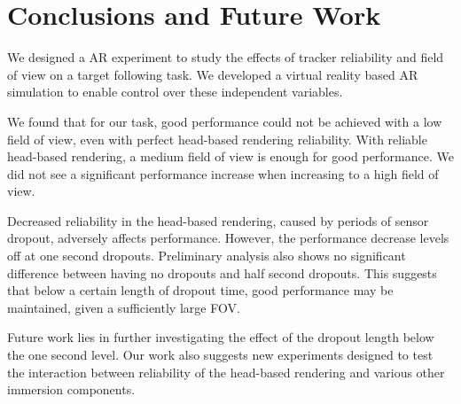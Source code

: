 \documentclass{acmsiggraph}                     %
\begin{document}

\section{Conclusions and Future Work}

We designed a AR experiment to study the effects of tracker reliability and field of view on a target following task.  We developed a virtual reality based AR simulation to enable control over these independent variables.

We found that for our task, good performance could not be achieved with a low field of view, even with perfect head-based rendering reliability.
With reliable head-based rendering, a medium field of view is enough for good performance.  We did not see a significant performance increase when increasing to a high field of view.

Decreased reliability in the head-based rendering, caused by periods of sensor dropout, adversely affects performance.  However, the performance decrease levels off at one second dropouts.  Preliminary analysis also shows no significant difference between having no dropouts and half second dropouts.  This suggests that below a certain length of dropout time, good performance may be maintained, given a sufficiently large FOV.%

Future work lies in further investigating the effect of the dropout length 
below the one second level.  Our work also suggests new experiments designed to test the interaction between reliability of the head-based rendering and various other immersion components.




\end{document}
